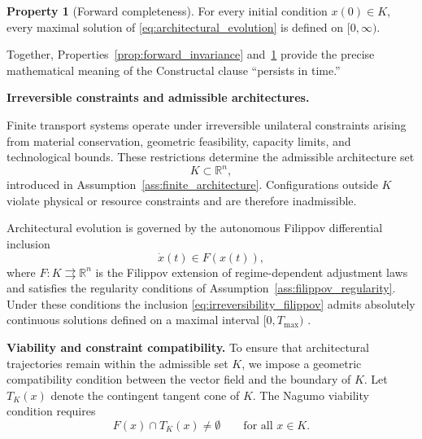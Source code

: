 \documentclass[12pt]{article}
\theoremstyle{plain}
\theoremstyle{definition}
\newtheorem{property}[theorem]{Property}
\theoremstyle{remark}
\begin{document}
\begin{property}[Forward completeness]
\label{prop:forward_completeness}
For every initial condition $x(0)\in K$,
every maximal solution of
\eqref{eq:architectural_evolution}
is defined on $[0,\infty)$.
\end{property}

Together, Properties~\ref{prop:forward_invariance}
and~\ref{prop:forward_completeness}
provide the precise mathematical meaning of the Constructal clause
``persists in time.''

\medskip

\noindent
\textbf{Irreversible constraints and admissible architectures.}

Finite transport systems operate under irreversible unilateral
constraints arising from material conservation,
geometric feasibility,
capacity limits,
and technological bounds.
These restrictions determine the admissible architecture set
\begin{equation}
K \subset \mathbb{R}^n,
\label{eq:K_irreversibility}
\end{equation}
introduced in Assumption~\ref{ass:finite_architecture}.
Configurations outside $K$ violate physical or resource constraints
and are therefore inadmissible.

Architectural evolution is governed by the autonomous Filippov
differential inclusion
\begin{equation}
\dot{x}(t) \in F(x(t)),
\label{eq:irreversibility_filippov}
\end{equation}
where $F:K\rightrightarrows\mathbb{R}^n$
is the Filippov extension of regime-dependent adjustment laws
and satisfies the regularity conditions of
Assumption~\ref{ass:filippov_regularity}.
Under these conditions the inclusion
\eqref{eq:irreversibility_filippov}
admits absolutely continuous solutions defined on a maximal interval
$[0,T_{\max})$ \cite[Ch.~2]{Filippov1988}.

\medskip

\noindent
\textbf{Viability and constraint compatibility.} To ensure that architectural trajectories remain within the admissible
set $K$, we impose a geometric compatibility condition between the
vector field and the boundary of $K$.
Let $T_K(x)$ denote the contingent tangent cone of $K$.
The Nagumo viability condition requires
\begin{equation}
F(x) \cap T_K(x) \neq \emptyset
\qquad \text{for all } x\in K.
\label{eq:viability_irreversibility}
\end{equation}
\end{document}
